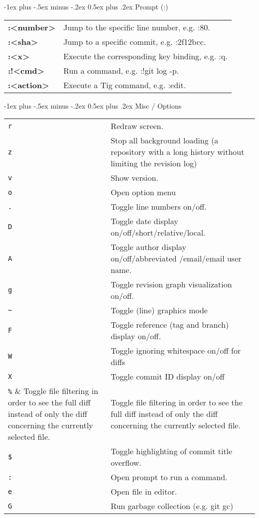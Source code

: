 \documentclass[10pt,landscape]{article}
\makeatletter
\renewcommand{\section}{\@startsection{section}{1}{0mm}%
                                {-1ex plus -.5ex minus -.2ex}%
                                {0.5ex plus .2ex}%
                                {\normalfont\large\bfseries}}
\makeatother
\begin{document}
\begin{multicols}{3}
\section{Prompt (:)}
\begin{tabular}{@{}ll@{}}
\textbf{:\textless number\textgreater} & Jump to the specific line number, e.g. :80. \\
\textbf{:\textless sha\textgreater} & Jump to a specific commit, e.g. :2f12bcc. \\
\textbf{:\textless x\textgreater} & Execute the corresponding key binding, e.g. :q. \\
\textbf{:!\textless cmd\textgreater} & Run a command, e.g. :!git log -p. \\
\textbf{:\textless action\textgreater} & Execute a Tig command, e.g. :edit. \\
\end{tabular}

\section{Misc / Options}
\begin{tabular}{@{}lp{6.5cm}@{}}
\verb!r! & Redraw screen. \\
\verb!z! & Stop all background loading (a repository with a long history without limiting the revision log) \\
\verb!v! & Show version. \\
\verb!o! & Open option menu \\
\verb!.! & Toggle line numbers on/off. \\
\verb!D! & Toggle date display on/off/short/relative/local. \\
\verb!A! & Toggle author display on/off/abbreviated /email/email user name. \\
\verb!g! & Toggle revision graph visualization on/off. \\
\verb!~! & Toggle (line) graphics mode \\
\verb!F! & Toggle reference (tag and branch) display on/off. \\
\verb!W! & Toggle ignoring whitespace on/off for diffs \\
\verb!X! & Toggle commit ID display on/off \\
\verb!%! & Toggle file filtering in order to see the full diff instead of only the diff concerning the currently selected file. \\
\verb!$! & Toggle highlighting of commit title overflow. \\
\verb!:! & Open prompt to run a command. \\
\verb!e! & Open file in editor. \\
\verb!G! & Run garbage collection (e.g. git gc) \\
\end{tabular}


\end{multicols}
\end{document}
